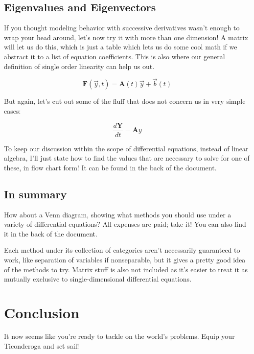 \documentclass[10pt]{extarticle}
\begin{document}
\begin{multicols}{2}
\subsection{Eigenvalues and Eigenvectors}

If you thought modeling behavior with successive derivatives wasn't enough to
wrap your head around, let's now try it with more than one dimension! A matrix
will let us do this, which is just a table which lets us do some cool math if
we abstract it to a list of equation coefficients.  This is also where our
general definition of single order linearity can help us out.

\begin{equation*}
    \mathbf{F}(\vec{y}, t) = \mathbf{A}(t)\vec{y} + \vec{b}(t)
\end{equation*}

But again, let's cut out some of the fluff that does not concern us in very
simple cases:

\begin{equation*}
    \dfrac{d \mathbf{Y}}{dt} = \mathbf{A}y
\end{equation*}

To keep our discussion within the scope of differential equations, instead of
linear algebra, I'll just state how to find the values that are necessary to
solve for one of these, in flow chart form! It can be found in the back of the
document.


\subsection{In summary}

How about a Venn diagram, showing what methods you should use under a variety
of differential equations? All expenses are paid; take it! You can also find it
in the back of the document.

Each method under its collection of categories aren't necessarily guaranteed to
work, like separation of variables if nonseparable, but it gives a pretty good
idea of the methods to try. Matrix stuff is also not included as it's easier to
treat it as mutually exclusive to single-dimensional differential equations.


\section{Conclusion}

It now seems like you're ready to tackle on the world's problems. Equip your
Ticonderoga and set sail!



\end{multicols}
\end{document}

